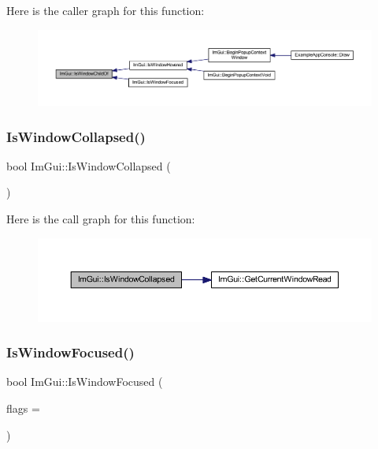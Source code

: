 Here is the caller graph for this function\+:
\nopagebreak
\begin{figure}[H]
\begin{center}
\leavevmode
\includegraphics[width=350pt]{namespace_im_gui_a2ca7721bfc85f5e98c212c2e9ad793b5_icgraph}
\end{center}
\end{figure}
\mbox{\label{namespace_im_gui_a2a6492aea9013c0078fc530a66e11768}} 
\subsubsection{\texorpdfstring{Is\+Window\+Collapsed()}{IsWindowCollapsed()}}
{\footnotesize\ttfamily bool Im\+Gui\+::\+Is\+Window\+Collapsed (\begin{DoxyParamCaption}{ }\end{DoxyParamCaption})}

Here is the call graph for this function\+:
\nopagebreak
\begin{figure}[H]
\begin{center}
\leavevmode
\includegraphics[width=350pt]{namespace_im_gui_a2a6492aea9013c0078fc530a66e11768_cgraph}
\end{center}
\end{figure}
\mbox{\label{namespace_im_gui_a51ed119ab4be7fcf47a34644e262c87e}} 
\subsubsection{\texorpdfstring{Is\+Window\+Focused()}{IsWindowFocused()}}
{\footnotesize\ttfamily bool Im\+Gui\+::\+Is\+Window\+Focused (\begin{DoxyParamCaption}\item[{\mbox{\hyperlink{imgui_8h_a4445363c9e1c008fee2c255d83046248}{Im\+Gui\+Focused\+Flags}}}]{flags = {} }\end{DoxyParamCaption})}

